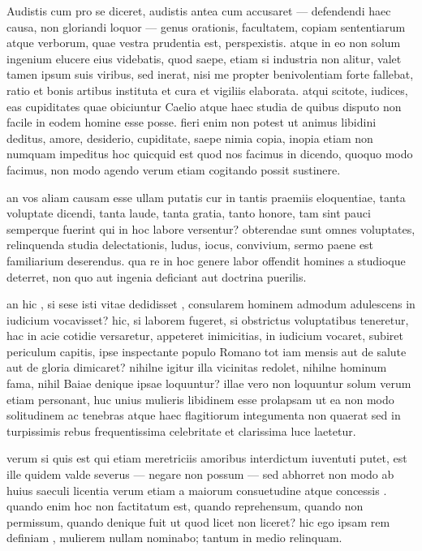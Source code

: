  Audistis cum pro se diceret, audistis antea cum accusaret — defendendi haec causa, non gloriandi loquor — genus orationis, facultatem, copiam sententiarum atque verborum, quae vestra prudentia est, perspexistis. atque in eo non solum ingenium elucere eius videbatis, quod saepe, etiam si industria non alitur, valet tamen ipsum suis viribus, sed inerat, nisi me propter benivolentiam forte fallebat, ratio et bonis artibus instituta et cura et vigiliis elaborata. atqui scitote, iudices, eas cupiditates quae obiciuntur Caelio atque haec studia de quibus disputo non facile in eodem homine esse posse. fieri enim non potest ut animus libidini deditus, amore, desiderio, cupiditate, saepe nimia copia, inopia etiam non numquam impeditus hoc quicquid est quod nos facimus in dicendo, quoquo modo facimus, non modo agendo verum etiam cogitando possit sustinere.

 an vos aliam causam esse ullam putatis cur in tantis praemiis eloquentiae, tanta voluptate dicendi, tanta laude, tanta gratia, tanto honore, tam sint pauci semperque fuerint qui in hoc labore versentur? obterendae sunt omnes voluptates, relinquenda studia delectationis, ludus, iocus, convivium, sermo paene est familiarium deserendus. qua re in hoc genere labor offendit homines a studioque deterret, non quo aut ingenia deficiant aut doctrina puerilis.

 an hic , si sese isti vitae dedidisset , consularem hominem admodum adulescens in iudicium vocavisset? hic, si laborem fugeret, si obstrictus voluptatibus teneretur, hac in acie cotidie versaretur, appeteret inimicitias, in iudicium vocaret, subiret periculum capitis, ipse inspectante populo Romano tot iam mensis aut de salute aut de gloria dimicaret? nihilne igitur illa vicinitas redolet, nihilne hominum fama, nihil Baiae denique ipsae loquuntur? illae vero non loquuntur solum verum etiam personant, huc unius mulieris libidinem esse prolapsam ut ea non modo solitudinem ac tenebras atque haec flagitiorum integumenta non quaerat sed in turpissimis rebus frequentissima celebritate et clarissima luce laetetur.

 verum si quis est qui etiam meretriciis amoribus interdictum iuventuti putet, est ille quidem valde severus — negare non possum — sed abhorret non modo ab huius saeculi licentia verum etiam a maiorum consuetudine atque concessis . quando enim hoc non factitatum est, quando reprehensum, quando non permissum, quando denique fuit ut quod licet non liceret? hic ego ipsam rem definiam , mulierem nullam nominabo; tantum in medio relinquam.

